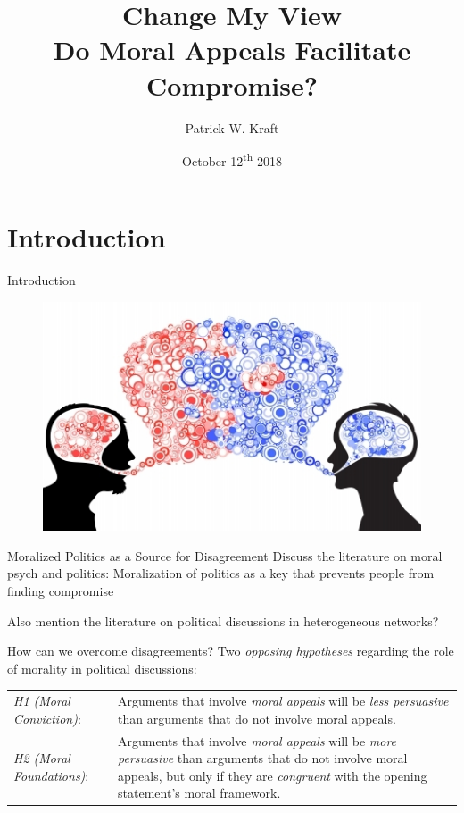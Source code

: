 \documentclass{beamer}
\author{Patrick W. Kraft}
\title{Change My View\\
{\large Do Moral Appeals Facilitate Compromise?}}
\institute{MAPPS Meeting\\Marquette University}
\date{October 12\textsuperscript{th} 2018}
\begin{document}
\section{Introduction}
\frame{\titlepage}

\begin{frame}{Introduction}
\begin{figure}
	\includegraphics[scale=.9]{fig/the-conversation.jpeg}
\end{figure}
\end{frame}


\begin{frame}{Moralized Politics as a Source for Disagreement}
Discuss the literature on moral psych and politics: Moralization of politics as a key that prevents people from finding compromise

Also mention the literature on political discussions in heterogeneous networks?
\end{frame}

\begin{frame}{How can we overcome disagreements?}
Two \emph{opposing hypotheses} regarding the role of morality in political discussions:\\
\vspace{1em}
\begin{tabularx}{\textwidth}{lX}
	\textit{H1 (\emph{Moral Conviction})}: & Arguments that involve \emph{moral appeals} will be \emph{less persuasive} than arguments that do not involve moral appeals.\\
	\textit{H2 (\emph{Moral Foundations})}: & Arguments that involve \emph{moral appeals} will be \emph{more persuasive} than arguments that do not involve moral appeals, but only if they are \emph{congruent} with the opening statement's moral framework.
\end{tabularx}
\end{frame}
\end{document}
